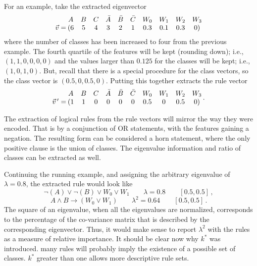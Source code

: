 \documentclass[10pt]{article}
\begin{document}
For an example, take the extracted eigenvector
\[\mqty{\, \\\vec{v} = } \:\mqty{A&B&C&\bar{A}&\bar{B}&\bar{C}&W_0&W_1&W_2&W_3\\(6&5&4&3&2&1&0.3&0.1&0.3&0)}\]
where the number of classes has been increased to four from the previous example. The fourth quartile of the features will be kept (rounding down); i.e., $(1,1,0,0,0,0)$ and the values larger than $0.125$ for the classes will be kept; i.e., $(1, 0, 1, 0)$. But, recall that there is a special procedure for the class vectors, so the class vector is $(0.5, 0, 0.5, 0)$. Putting this together extracts the rule vector 
\[\mqty{\, \\\vec{v}\, ^\prime = } \:\mqty{A&B&C&\bar{A}&\bar{B}&\bar{C}&W_0&W_1&W_2&W_3\\(1&1&0&0&0&0&0.5&0&0.5&0)} \, .\]

The extraction of logical rules from the rule vectors will mirror the way they were encoded. That is by a conjunction of OR statements, with the features gaining a negation. The resulting form can be considered a horn statement, where the only positive clause is the union of classes. The eigenvalue information and ratio of classes can be extracted as well. 

Continuing the running example, and assigning the arbitrary eigenvalue of $\lambda =0.8$, the extracted rule would look like
\[\neg(A)\lor \neg(B) \lor W_0 \lor W_1 \qquad \lambda=0.8 \qquad [0.5, 0.5] \, ,\]
\[A \land B \rightarrow (W_0 \lor W_1) \qquad \lambda^2=0.64 \qquad [0.5, 0.5] \, .\]
The square of an eigenvalue, when all the eigenvalues are normalized, corresponds to the percentage of the co-variance matrix that is described by the corresponding eigenvector. Thus, it would make sense to report $\lambda^2$ with the rules as a measure of relative importance. It should be clear now why $k^*$ was introduced. many rules will probably imply the existence of a possible set of classes. $k^*$ greater than one allows more descriptive rule sets.
\end{document}
